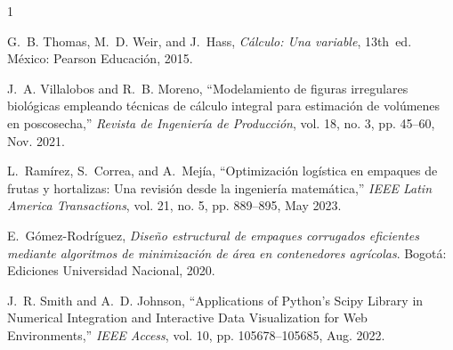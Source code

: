 \documentclass[conference, Spanish]{IEEEtran}
\begin{document}
\begin{thebibliography}{1}

G.~B. Thomas, M.~D. Weir, and J.~Hass, \emph{Cálculo: Una variable}, 13th~ed. México: Pearson Educación, 2015.

J.~A. Villalobos and R.~B. Moreno, ``Modelamiento de figuras irregulares biológicas empleando técnicas de cálculo integral para estimación de volúmenes en poscosecha,'' \emph{Revista de Ingeniería de Producción}, vol. 18, no. 3, pp. 45--60, Nov. 2021.

L.~Ramírez, S.~Correa, and A.~Mejía, ``Optimización logística en empaques de frutas y hortalizas: Una revisión desde la ingeniería matemática,'' \emph{IEEE Latin America Transactions}, vol. 21, no. 5, pp. 889--895, May 2023.

E.~Gómez-Rodríguez, \emph{Diseño estructural de empaques corrugados eficientes mediante algoritmos de minimización de área en contenedores agrícolas}. Bogotá: Ediciones Universidad Nacional, 2020.

J.~R. Smith and A.~D. Johnson, ``Applications of Python's Scipy Library in Numerical Integration and Interactive Data Visualization for Web Environments,'' \emph{IEEE Access}, vol. 10, pp. 105678--105685, Aug. 2022.

\end{thebibliography}
\end{document}
